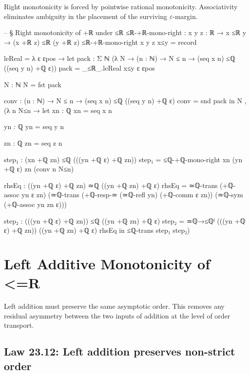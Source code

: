 \documentclass[11pt,a4paper]{book}
\def\mathbb#1{#1}%
\def\texorpdfstring#1#2{#2}%
\begin{document}
Right monotonicity is forced by pointwise rational monotonicity. Associativity eliminates ambiguity in the placement of the surviving $\varepsilon$-margin.

\begin{code}
-- § Right monotonicity of +ℝ under ≤ℝ
≤ℝ-+ℝ-mono-right : {x y z : ℝ} → x ≤ℝ y → (x +ℝ z) ≤ℝ (y +ℝ z)
≤ℝ-+ℝ-mono-right {x} {y} {z} x≤y = record
  { leReal = λ ε εpos →
      let
        pack : Σ ℕ (λ N → (n : ℕ) → N ≤ n → (seq x n) ≤ℚ ((seq y n) +ℚ ε))
        pack = _≤ℝ_.leReal x≤y ε εpos

        N : ℕ
        N = fst pack

        conv : (n : ℕ) → N ≤ n → (seq x n) ≤ℚ ((seq y n) +ℚ ε)
        conv = snd pack
      in
      N , (λ n N≤n →
        let
          xn : ℚ
          xn = seq x n

          yn : ℚ
          yn = seq y n

          zn : ℚ
          zn = seq z n

          step₁ : (xn +ℚ zn) ≤ℚ (((yn +ℚ ε) +ℚ zn))
          step₁ = ≤ℚ-+ℚ-mono-right xn (yn +ℚ ε) zn (conv n N≤n)

          rhsEq : ((yn +ℚ ε) +ℚ zn) ≃ℚ ((yn +ℚ zn) +ℚ ε)
          rhsEq =
            ≃ℚ-trans
              (+ℚ-assoc yn ε zn)
              (≃ℚ-trans
                (+ℚ-resp-≃ (≃ℚ-refl yn) (+ℚ-comm ε zn))
                (≃ℚ-sym (+ℚ-assoc yn zn ε)))

          step₂ : (((yn +ℚ ε) +ℚ zn)) ≤ℚ ((yn +ℚ zn) +ℚ ε)
          step₂ = ≃ℚ→≤ℚˡ {(((yn +ℚ ε) +ℚ zn))} {((yn +ℚ zn) +ℚ ε)} rhsEq
        in
        ≤ℚ-trans step₁ step₂)
  }
\end{code}


\section{Left Additive Monotonicity of \texorpdfstring{$\le_{\mathbb{R}}$}{<=R}}

Left addition must preserve the same asymptotic order. This removes any residual asymmetry between the two inputs of addition at the level of order transport.

\subsection*{Law 23.12: Left addition preserves non-strict order}
\end{document}
